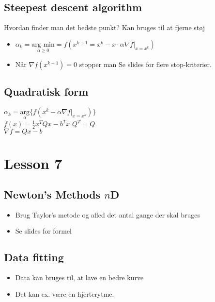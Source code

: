 \documentclass[danish, 10pt]{Memoir}
\begin{document}
\subsection{Steepest descent algorithm}
Hvordan finder man det bedste punkt?
Kan bruges til at fjerne støj

\begin{itemize}
	\item $\alpha_k = \underset{\alpha \geq 0}{\text{arg min}} = f(x^{k+1} = x^k - x \cdot \alpha \nabla f |_{x=x^k})$
	\item Når $\nabla f(x^{k+1}) = 0$ stopper man
	\subitem Se slides for flere stop-kriterier.
\end{itemize}


\subsection{Quadratisk form}

$\alpha _k = \underset{\alpha}{\text{arg}} \{ f(x^k - \alpha \nabla f|_{x=x^k}) \}$ 
\\
$f(x) = \frac{1}{2} x^T Q x - b^T x$ \quad $Q^T = Q$
\\
$\nabla f = Q x - b$



\newpage
\section*{Lesson 7}

\subsection*{Newton's Methods $n$D}
\begin{itemize}
	\item Brug Taylor's metode og afled det antal gange der skal bruges
	\item Se slides for formel
\end{itemize}


\subsection*{Data fitting}
\begin{itemize}
 	\item Data kan bruges til, at lave en bedre kurve
 	\item Det kan ex. være en hjerterytme.
 \end{itemize} 
\end{document}
